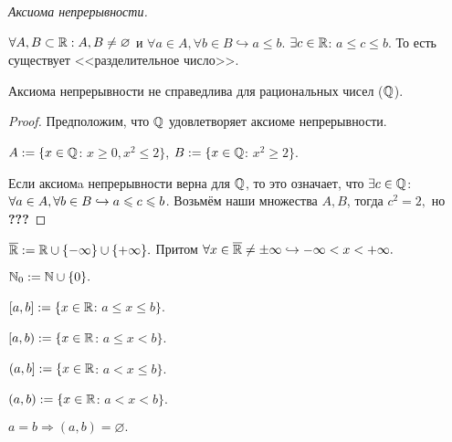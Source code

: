     \begin{definition}
        \textit{Аксиома непрерывности.} 
        
        $\forall A, B \subset \mathbb{R}: A, B \neq \varnothing$ и $\forall a \in A, \forall b \in B \hookrightarrow a \leq b.$ $\exists c \in \mathbb{R}$: $a \leq c \leq b.$ То есть существует <<разделительное число>>.
    \end{definition}

    \begin{note}
        Аксиома непрерывности не справедлива для рациональных чисел ($\mathbb{Q}$).
    \end{note}
    \begin{proof}
        Предположим, что $\mathbb{Q}$ удовлетворяет аксиоме непрерывности.

        $A := \{ x \in \mathbb{Q}$: $x \geq 0, x^2 \leq 2\}$, $B := \{ x \in \mathbb{Q}$: $x^2 \geq 2 \}$.

        Если аксиомa непрерывности верна для $\mathbb{Q}$, то это означает, что $\exists c \in \mathbb{Q}$: $\forall a \in A, \newline \forall b \in B \hookrightarrow a \leq c \leq b$. Возьмём наши множества $A, B$, тогда $c^2 = 2,$ но \textbf{???}
    \end{proof}

    \begin{definition}
        $\overline{\mathbb{R}} := \mathbb{R} \cup \{ -\infty \} \cup \{ +\infty \}.$ Притом $\forall x \in \overline{\mathbb{R}} \neq \pm \infty \hookrightarrow -\infty < x < +\infty.$
    \end{definition}
    \begin{definition}
        $\mathbb{N}_{0} := \mathbb{N} \cup \{ 0 \}.$
    \end{definition}

    \begin{definition}
        $[a, b] := \{x \in \mathbb{R}$: $a \leq x \leq b \}.$
    \end{definition}
    \begin{definition}
        $[a, b) := \{x \in \mathbb{R}$: $a \leq x < b \}.$
    \end{definition}
    \begin{definition}
        $(a, b] := \{x \in \mathbb{R}$: $a < x \leq b \}.$
    \end{definition}
    
    \begin{definition}
        $(a, b) := \{x \in \mathbb{R}$: $a < x < b \}.$
    \end{definition}
    \begin{definition}
        $a = b \Rightarrow (a, b) = \varnothing .$
    \end{definition}

